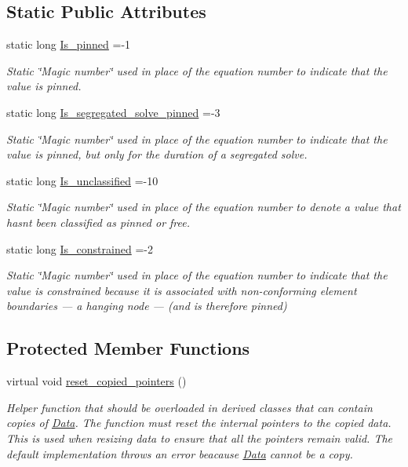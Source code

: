 \subsection*{Static Public Attributes}
\begin{DoxyCompactItemize}
\item 
static long \hyperlink{classoomph_1_1Data_a3f351624d334f1babf55170d539b36fa}{Is\+\_\+pinned} =-\/1
\begin{DoxyCompactList}\small\item\em Static \char`\"{}\+Magic number\char`\"{} used in place of the equation number to indicate that the value is pinned. \end{DoxyCompactList}\item 
static long \hyperlink{classoomph_1_1Data_ad83f76cbcd76d8ed96aca53dd04d5abf}{Is\+\_\+segregated\+\_\+solve\+\_\+pinned} =-\/3
\begin{DoxyCompactList}\small\item\em Static \char`\"{}\+Magic number\char`\"{} used in place of the equation number to indicate that the value is pinned, but only for the duration of a segregated solve. \end{DoxyCompactList}\item 
static long \hyperlink{classoomph_1_1Data_ac56011da9a923069793ecc3cb54f5e20}{Is\+\_\+unclassified} =-\/10
\begin{DoxyCompactList}\small\item\em Static \char`\"{}\+Magic number\char`\"{} used in place of the equation number to denote a value that hasn\textquotesingle{}t been classified as pinned or free. \end{DoxyCompactList}\item 
static long \hyperlink{classoomph_1_1Data_a71225ddbb54744f6fe662af5a5520ab8}{Is\+\_\+constrained} =-\/2
\begin{DoxyCompactList}\small\item\em Static \char`\"{}\+Magic number\char`\"{} used in place of the equation number to indicate that the value is constrained because it is associated with non-\/conforming element boundaries --- a hanging node --- (and is therefore pinned) \end{DoxyCompactList}\end{DoxyCompactItemize}
\subsection*{Protected Member Functions}
\begin{DoxyCompactItemize}
\item 
virtual void \hyperlink{classoomph_1_1Data_afd33533f3ddf61bc34106a4dc72de541}{reset\+\_\+copied\+\_\+pointers} ()
\begin{DoxyCompactList}\small\item\em Helper function that should be overloaded in derived classes that can contain copies of \hyperlink{classoomph_1_1Data}{Data}. The function must reset the internal pointers to the copied data. This is used when resizing data to ensure that all the pointers remain valid. The default implementation throws an error beacause \hyperlink{classoomph_1_1Data}{Data} cannot be a copy. \end{DoxyCompactList}\end{DoxyCompactItemize}
